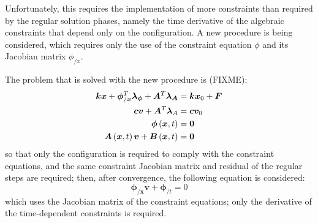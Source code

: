 \documentclass[10pt,dvips,fleqn,subeqn]{report}
\newcommand{\T}[1]{\bm{#1}}
\begin{document}
Unfortunately, this requires the implementation of more constraints
than required by the regular solution phases, namely the time derivative
of the algebraic constraints that depend only on the configuration.
A new procedure is being considered, which requires only the use 
of the constraint equation $\phi$ and its Jacobian matrix $\phi_{/x}$.

The problem that is solved with the new procedure is (FIXME):
\begin{align}
	\T{k} \T{x} + \T{\phi}_{/\T{x}}^T \T{\lambda}_{\T{\phi}} + \T{A}^T \T{\lambda}_{\T{A}} 
		& = \T{k} \T{x}_0 + \T{F} \\
	\T{c} \T{v} + \T{A}^T \T{\lambda}_{A} & = \T{c} \T{v}_0 \\
	\T{\phi}\plbr{\T{x}, t} & = \T{0} \\
	\T{A}\plbr{\T{x}, t} \T{v} + \T{B}\plbr{\T{x}, t} & = \T{0}
\end{align}
so that only the configuration is required to comply 
with the constraint equations, and the same constraint 
Jacobian matrix and residual of the regular steps are required;
then, after convergence, the following equation is considered:
\begin{equation}
	\T{\phi}_{/\T{x}} \T{v} + \T{\phi}_{/t} = 0
\end{equation}
which uses the Jacobian matrix of the constraint equations; 
only the derivative of the time-dependent constraints is required.
\end{document}
